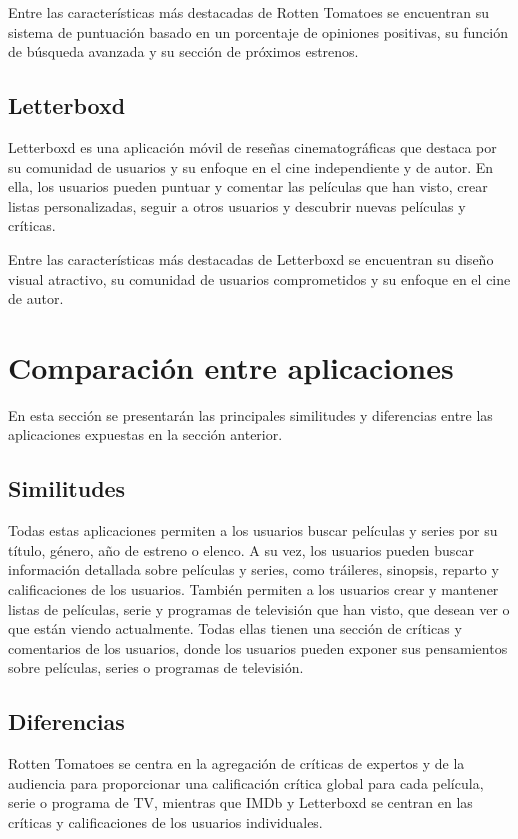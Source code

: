 Entre las características más destacadas de Rotten Tomatoes se encuentran su sistema de puntuación 
basado en un porcentaje de opiniones positivas, su función de búsqueda avanzada y su sección de 
próximos estrenos.

\subsection{Letterboxd}

Letterboxd es una aplicación móvil de reseñas cinematográficas que destaca por su comunidad de 
usuarios y su enfoque en el cine independiente y de autor. En ella, los usuarios pueden puntuar y 
comentar las películas que han visto, crear listas personalizadas, seguir a otros usuarios y descubrir 
nuevas películas y críticas.

Entre las características más destacadas de Letterboxd se encuentran su diseño visual atractivo, su 
comunidad de usuarios comprometidos y su enfoque en el cine de autor.


\section{Comparación entre aplicaciones}

En esta sección se presentarán las principales similitudes y diferencias entre las aplicaciones 
expuestas en la sección anterior.

\subsection{Similitudes}

Todas estas aplicaciones permiten a los usuarios buscar películas y series por su título, género, año 
de estreno o elenco. A su vez, los usuarios pueden buscar información detallada sobre películas y 
series, como tráileres, sinopsis, reparto y calificaciones de los usuarios. También permiten a los 
usuarios crear y mantener listas de películas, serie y programas de televisión que han visto, que 
desean ver o que están viendo actualmente. Todas ellas tienen una sección de críticas y comentarios de 
los usuarios, donde los usuarios pueden exponer sus pensamientos sobre películas, series o programas 
de televisión.


\subsection{Diferencias}

Rotten Tomatoes se centra en la agregación de críticas de expertos y de la audiencia para proporcionar 
una calificación crítica global para cada película, serie o programa de TV, mientras que IMDb y 
Letterboxd se centran en las críticas y calificaciones de los usuarios individuales.

